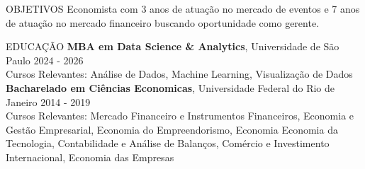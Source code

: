 \documentclass{resume} %
\begin{document}
\begin{rSection}{OBJETIVOS}
{Economista com 3 anos de atuação no mercado de eventos e 7 anos de atuação no mercado financeiro buscando oportunidade como gerente.}
\end{rSection}


\begin{rSection}{EDUCAÇÃO}
{\bf MBA em Data Science \& Analytics}, Universidade de São Paulo \hfill {2024 - 2026}\\
{\footnotesize Cursos Relevantes: Análise de Dados, Machine Learning, Visualização de Dados} \\

\vspace{-1.25em}
{\bf Bacharelado em Ciências Economicas}, Universidade Federal do Rio de Janeiro \hfill {2014 - 2019} \\
{\footnotesize Cursos Relevantes: Mercado Financeiro e Instrumentos Financeiros, Economia e Gestão Empresarial, Economia do Empreendorismo, Economia Economia da Tecnologia, Contabilidade e Análise de Balanços, Comércio e Investimento Internacional, Economia das Empresas} 
\end{rSection}
\end{document}
